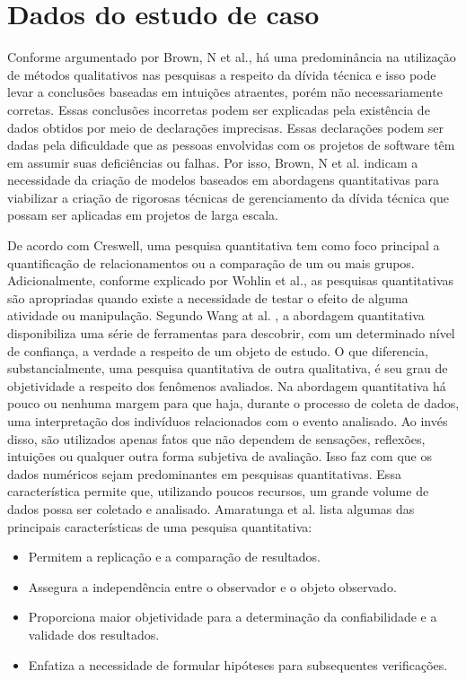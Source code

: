 \section{Dados do estudo de caso}


Conforme argumentado por Brown, N et al.\cite{brown2010managing}, há uma predominância na utilização de métodos qualitativos nas pesquisas a respeito da dívida técnica e isso pode levar a conclusões baseadas em intuições atraentes, porém não necessariamente corretas. Essas conclusões incorretas podem ser explicadas pela existência de dados obtidos por meio de declarações imprecisas. Essas declarações podem ser dadas pela dificuldade que as pessoas envolvidas com os projetos de software têm em assumir suas deficiências ou falhas. Por isso, Brown, N et al.\cite{brown2010managing} indicam a necessidade da criação de modelos baseados em abordagens quantitativas para viabilizar a criação de rigorosas técnicas de gerenciamento da dívida técnica que possam ser aplicadas em projetos de larga escala.

De acordo com Creswell\cite{w2016research}, uma pesquisa quantitativa tem como foco principal a quantificação de relacionamentos ou a comparação de um ou mais grupos. Adicionalmente, conforme explicado por Wohlin et al.\cite{wohlin2003empirical}, as pesquisas quantitativas são apropriadas quando existe a necessidade de testar o efeito de alguma atividade ou manipulação. Segundo Wang at al. \cite{wang201331}, a abordagem quantitativa disponibiliza uma série de ferramentas para descobrir, com um determinado nível de confiança, a verdade a respeito de um objeto de estudo. O que diferencia, substancialmente, uma pesquisa quantitativa de outra qualitativa, é seu grau de  objetividade a respeito dos fenômenos avaliados. Na abordagem quantitativa há pouco ou nenhuma margem para que haja, durante o processo de coleta de dados, uma interpretação dos indivíduos relacionados com o evento analisado. Ao invés disso, são utilizados apenas fatos que não dependem de sensações, reflexões, intuições ou qualquer outra forma subjetiva de avaliação. Isso faz com que os dados numéricos sejam predominantes em pesquisas quantitativas.  Essa característica permite que, utilizando poucos recursos, um grande volume de dados possa ser coletado e analisado.  Amaratunga et al. \cite{amaratunga2002quantitative} lista algumas das principais características de uma pesquisa quantitativa:

\begin{itemize}
\item Permitem a replicação e a comparação de resultados.
\item Assegura a independência entre o observador e o objeto observado.
\item Proporciona maior objetividade para a determinação da confiabilidade e a validade dos resultados.
\item Enfatiza a necessidade de formular hipóteses para subsequentes verificações.
\end{itemize}



